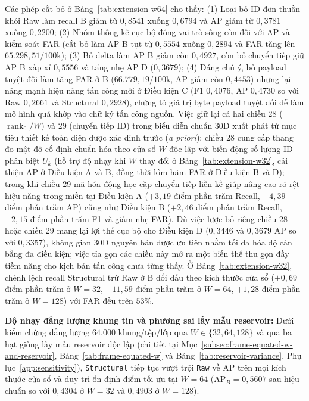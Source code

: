 \documentclass[12pt, a4paper, reqno, oneside]{book}
\DeclareRobustCommand{\code}[1]{\nolinkurl{#1}}
\begin{document}
Các phép cắt bỏ ở Bảng~\ref{tab:extension-w64} cho thấy: (1) Loại bỏ ID đơn thuần khỏi Raw làm recall B giảm từ $0{,}8541$ xuống $0{,}6794$ và AP giảm từ $0{,}3781$ xuống $0{,}2200$; (2) Nhóm thống kê cục bộ đóng vai trò sống còn đối với AP và kiểm soát FAR (cắt bỏ làm AP B tụt từ $0{,}5554$ xuống $0{,}2894$ và FAR tăng lên $65.298{,}51/100\text{k}$); (3) Bỏ delta làm AP B giảm còn $0{,}4927$, còn bỏ chuyển tiếp giữ AP B xấp xỉ $0{,}5556$ và tăng nhẹ AP D ($0{,}3679$); (4) Đáng chú ý, bỏ payload tuyệt đối làm tăng FAR ở B ($66.779{,}19/100\text{k}$, AP giảm còn $0{,}4453$) nhưng lại nâng mạnh hiệu năng tấn công mới ở Điều kiện C (F1 $0{,}4076$, AP $0{,}4730$ so với Raw $0{,}2661$ và Structural $0{,}2928$), chứng tỏ giá trị byte payload tuyệt đối dễ làm mô hình quá khớp vào chữ ký tấn công nguồn. Việc giữ lại cả hai chiều 28 ($\operatorname{rank}_0/W$) và 29 (chuyển tiếp ID) trong biểu diễn chuẩn 30D xuất phát từ mục tiêu thiết kế toàn diện được xác định trước (\textit{a priori}): chiều 28 cung cấp thang đo mật độ cố định chuẩn hóa theo cửa sổ $W$ độc lập với biến động số lượng ID phân biệt $U_k$ (hỗ trợ độ nhạy khi $W$ thay đổi ở Bảng~\ref{tab:extension-w32}, cải thiện AP ở Điều kiện A và B, đồng thời kìm hãm FAR ở Điều kiện B và D); trong khi chiều 29 mã hóa động học cặp chuyển tiếp liền kề giúp nâng cao rõ rệt hiệu năng trong miền tại Điều kiện A ($+3{,}19$ điểm phần trăm Recall, $+4{,}39$ điểm phần trăm AP) cũng như Điều kiện B ($+2{,}46$ điểm phần trăm Recall, $+2{,}15$ điểm phần trăm F1 và giảm nhẹ FAR). Dù việc lược bỏ riêng chiều 28 hoặc chiều 29 mang lại lợi thế cục bộ cho Điều kiện D ($0{,}3446$ và $0{,}3679$ AP so với $0{,}3357$), không gian 30D nguyên bản được ưu tiên nhằm tối đa hóa độ cân bằng đa điều kiện; việc tỉa gọn các chiều này mở ra một biến thể thu gọn đầy tiềm năng cho kịch bản tấn công chưa từng thấy. Ở Bảng~\ref{tab:extension-w32}, chênh lệch recall Structural trừ Raw ở B đổi dấu theo kích thước cửa sổ ($+0{,}69$ điểm phần trăm ở $W=32$, $-11{,}59$ điểm phần trăm ở $W=64$, $+1{,}28$ điểm phần trăm ở $W=128$) với FAR đều trên $53\%$.

\noindent\textbf{Độ nhạy đẳng lượng khung tin và phương sai lấy mẫu reservoir:} Dưới kiểm chứng đẳng lượng $64.000$ khung/tệp/lớp qua $W \in \{32, 64, 128\}$ và qua ba hạt giống lấy mẫu reservoir độc lập (chi tiết tại Mục~\ref{subsec:frame-equated-w-and-reservoir}, Bảng~\ref{tab:frame-equated-w} và Bảng~\ref{tab:reservoir-variance}, Phụ lục~\ref{app:sensitivity}), \code{Structural} tiếp tục vượt trội \code{Raw} về AP trên mọi kích thước cửa sổ và duy trì ổn định điểm tối ưu tại $W=64$ ($\text{AP}_B=0{,}5607$ sau hiệu chuẩn so với $0{,}4304$ ở $W=32$ và $0{,}4903$ ở $W=128$).
\end{document}
